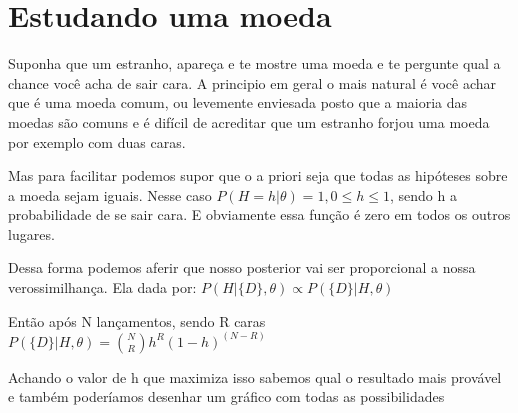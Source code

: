 \documentclass{article}
\begin{document}
\section{Estudando uma moeda}

Suponha que um estranho, apareça e te mostre uma moeda e te pergunte qual a chance você acha de sair cara. A principio em geral o mais natural é você achar que é uma moeda comum, ou levemente enviesada posto que a maioria das moedas são comuns e é difícil de acreditar que um estranho forjou uma moeda por exemplo com duas caras.

Mas para facilitar podemos supor que o a priori seja que todas as hipóteses sobre a moeda sejam iguais. Nesse caso $P(H=h|\theta)=1, 0\leq h \leq 1$, sendo h a probabilidade de se sair cara. E obviamente essa função é zero em todos os outros lugares.

Dessa forma podemos aferir que nosso posterior vai ser proporcional a nossa verossimilhança. Ela dada por: $P(H|\{D\},\theta) \propto P(\{D\}|H,\theta)$

Então após N lançamentos, sendo R caras $P(\{D\}|H,\theta)=\binom{N}{R}h^{R}(1-h)^{(N-R)}$

Achando o valor de h que maximiza isso sabemos qual o resultado mais provável e também poderíamos desenhar um gráfico com todas as possibilidades
\end{document}

